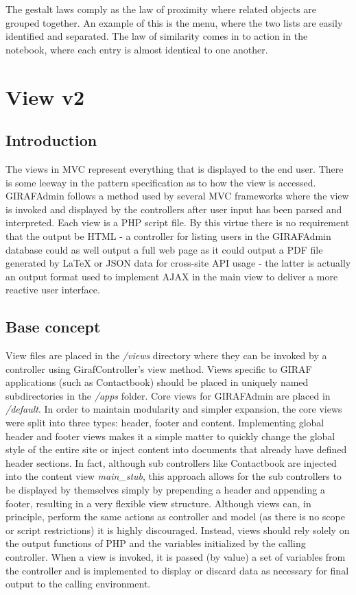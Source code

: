 The gestalt laws comply as the law of proximity where related objects are grouped together. An example of this is the menu, where the two lists are easily identified and separated. The law of similarity comes in to action in the notebook, where each entry is almost identical to one another.


\section{View v2}
\subsection{Introduction}
The views in MVC represent everything that is displayed to the end user. There is some leeway in the pattern specification as to how the view is accessed. GIRAFAdmin follows a method used by several MVC frameworks where the view is invoked and displayed by the controllers after user input has been parsed and interpreted. Each view is a PHP script file. By this virtue there is no requirement that the output be HTML - a controller for listing users in the GIRAFAdmin database could as well output a full web page as it could output a PDF file generated by LaTeX or JSON data for cross-site API usage - the latter is actually an output format used to implement AJAX in the main view to deliver a more reactive user interface.

\subsection{Base concept}
View files are placed in the \emph{/views} directory where they can be invoked by a controller using GirafController's view method. Views specific to GIRAF applications (such as Contactbook) should be placed in uniquely named subdirectories in the \emph{/apps} folder. Core views for GIRAFAdmin are placed in \emph{/default}.
In order to maintain modularity and simpler expansion, the core views were split into three types: header, footer and content. Implementing global header and footer views makes it a simple matter to quickly change the global style of the entire site or inject content into documents that already have defined header sections. In fact, although sub controllers like Contactbook are injected into the content view \emph{main\_stub}, this approach allows for the sub controllers to be displayed by themselves simply by prepending a header and appending a footer, resulting in a very flexible view structure.
Although views can, in principle, perform the same actions as controller and model (as there is no scope or script restrictions) it is highly discouraged. Instead, views should rely solely on the output functions of PHP and the variables initialized by the calling controller. When a view is invoked, it is passed (by value) a set of variables from the controller and is implemented to display or discard data as necessary for final output to the calling environment.

